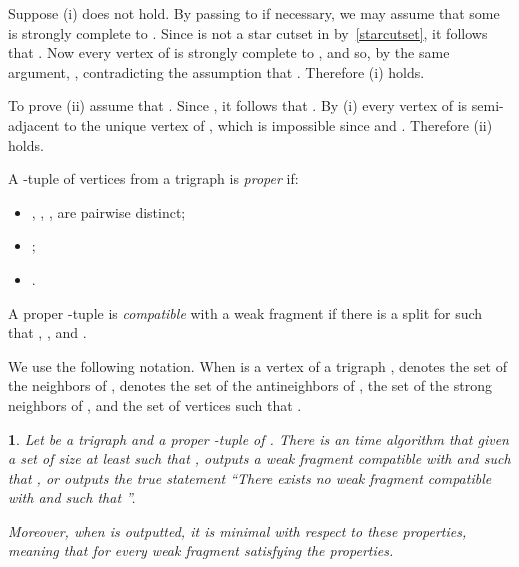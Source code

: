 \documentclass[11 pt] {article}
\newcommand\blackslug{\hbox{\hskip 1pt \vrule width 4pt height 8pt depth 1.5pt
        \hskip 1pt}}
\newcommand\bbox{\hfill \quad \blackslug \medbreak}
\newtheorem{theorem}{}[section]
\begin{document}
Suppose (i) does not hold. By passing to  if necessary,
we may assume that some  is strongly complete to
. Since  is not a star cutset
in  by~\ref{starcutset}, it follows that . Now every
vertex of  is strongly complete to , and so, by the same
argument, , contradicting the assumption that . Therefore (i) holds.

To prove (ii) assume that . Since , it follows that .
By (i)  every vertex
of  is semi-adjacent to the unique vertex of , which is impossible
since  and . Therefore (ii) holds.
\bbox

A -tuple  of vertices from a trigraph  is
\emph{proper} if:

\begin{itemize}
\item , , ,  are pairwise distinct;
\item ;
\item .
\end{itemize}

A proper -tuple  is \emph{compatible} with a
weak fragment  if there is a split
 for  such that ,
,  and .

We use the following notation. When  is a vertex of a trigraph ,
 denotes the set of the neighbors of , 
denotes the set of the antineighbors of ,  the set of the
strong neighbors of , and  the set of vertices  such
that .

\begin{theorem}\label{l:forcing}
  Let  be a trigraph and  a proper
  -tuple of .  There is an  time algorithm that given a
  set  of size at least  such that , outputs a weak fragment  compatible with  and
  such that , or outputs the true statement ``There
  exists no weak fragment  compatible with  and such that ''.

  Moreover, when  is outputted, it is minimal with respect to
  these properties, meaning that  for every weak
  fragment  satisfying the properties.
\end{theorem}
\end{document}
